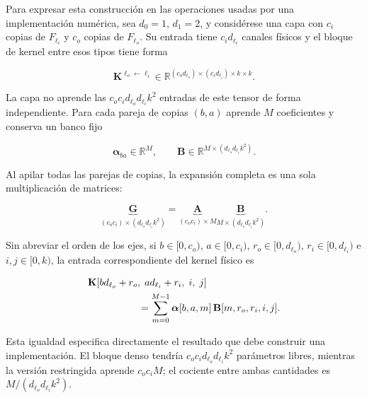 Para expresar esta construcción en las operaciones usadas por una
implementación numérica, sea \(d_0=1\), \(d_1=2\), y considérese una capa con
\(c_i\) copias de \(F_{\ell_i}\) y \(c_o\) copias de
\(F_{\ell_o}\). Su entrada tiene \(c_i d_{\ell_i}\) canales físicos y el
bloque de kernel entre esos tipos tiene forma

\begin{equation}
    \mathbf{K}^{\ell_o\leftarrow\ell_i}
    \in\mathbb{R}^{(c_od_{\ell_o})\times(c_id_{\ell_i})\times k\times k}.
    \label{eq:forma-bloque-kernel}
\end{equation}

La capa no aprende las \(c_oc_id_{\ell_o}d_{\ell_i}k^2\) entradas de este
tensor de forma independiente. Para cada pareja de copias \((b,a)\) aprende
\(M\) coeficientes y conserva un banco fijo

\begin{equation}
    \boldsymbol{\alpha}_{ba}\in\mathbb{R}^{M},\qquad
    \mathbf{B}\in\mathbb{R}^{M\times(d_{\ell_o}d_{\ell_i}k^2)}.
    \label{eq:formas-coeficientes-bases}
\end{equation}

Al apilar todas las parejas de copias, la expansión completa es una sola
multiplicación de matrices:

\begin{equation}
    \underbrace{\mathbf{G}}_{
      (c_oc_i)\times(d_{\ell_o}d_{\ell_i}k^2)}
    =
    \underbrace{\mathbf{A}}_{(c_oc_i)\times M}
    \underbrace{\mathbf{B}}_{M\times(d_{\ell_o}d_{\ell_i}k^2)}.
    \label{eq:matmul-expansion-kernel}
\end{equation}

Sin abreviar el orden de los ejes, si
\(b\in[0,c_o)\), \(a\in[0,c_i)\),
\(r_o\in[0,d_{\ell_o})\), \(r_i\in[0,d_{\ell_i})\) e
\(i,j\in[0,k)\), la entrada correspondiente del kernel físico es

\begin{equation}
\begin{split}
&\mathbf K[bd_{\ell_o}+r_o,\;ad_{\ell_i}+r_i,\;i,\;j]\\
&\hspace{18mm}=\sum_{m=0}^{M-1}
\boldsymbol\alpha[b,a,m]\,
\mathbf B[m,r_o,r_i,i,j].
\end{split}
\label{eq:indices-kernel-f01}
\end{equation}

Esta igualdad especifica directamente el resultado que debe construir una
implementación. El bloque denso tendría
\(c_oc_id_{\ell_o}d_{\ell_i}k^2\) parámetros libres, mientras la versión
restringida aprende \(c_oc_iM\); el cociente entre ambas cantidades es
\(M/(d_{\ell_o}d_{\ell_i}k^2)\).

